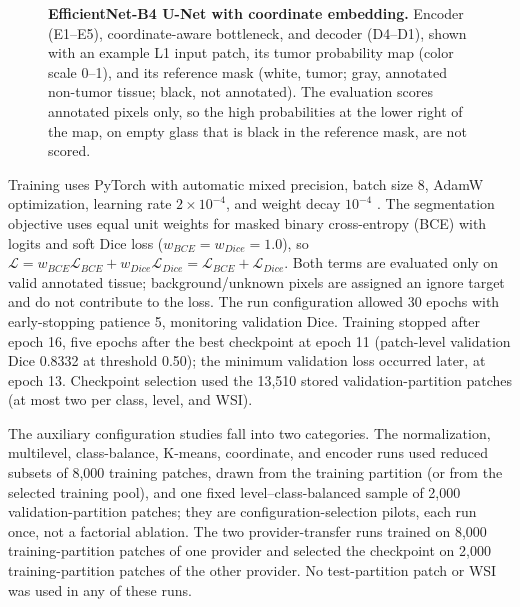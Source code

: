 \documentclass[10pt,letterpaper]{article}
\begin{document}
\begin{figure}[H]
\centering
\caption{\textbf{EfficientNet-B4 U-Net with coordinate embedding.} Encoder (E1--E5), coordinate-aware bottleneck, and decoder (D4--D1), shown with an example L1 input patch, its tumor probability map (color scale 0--1), and its reference mask (white, tumor; gray, annotated non-tumor tissue; black, not annotated). The evaluation scores annotated pixels only, so the high probabilities at the lower right of the map, on empty glass that is black in the reference mask, are not scored.}
\label{fig:arch}
\end{figure}

Training uses PyTorch with automatic mixed precision, batch size 8, AdamW optimization, learning rate $2\times10^{-4}$, and weight decay $10^{-4}$ \cite{bib36,bib37}. The segmentation objective uses equal unit weights for masked binary cross-entropy (BCE) with logits and soft Dice loss ($w_{BCE}=w_{Dice}=1.0$), so $\mathcal{L}=w_{BCE}\mathcal{L}_{BCE}+w_{Dice}\mathcal{L}_{Dice}=\mathcal{L}_{BCE}+\mathcal{L}_{Dice}$. Both terms are evaluated only on valid annotated tissue; background/unknown pixels are assigned an ignore target and do not contribute to the loss. The run configuration allowed 30 epochs with early-stopping patience 5, monitoring validation Dice. Training stopped after epoch 16, five epochs after the best checkpoint at epoch 11 (patch-level validation Dice 0.8332 at threshold 0.50); the minimum validation loss occurred later, at epoch 13. Checkpoint selection used the 13,510 stored validation-partition patches (at most two per class, level, and WSI).

The auxiliary configuration studies fall into two categories. The normalization, multilevel, class-balance, K-means, coordinate, and encoder runs used reduced subsets of 8,000 training patches, drawn from the training partition (or from the selected training pool), and one fixed level--class-balanced sample of 2,000 validation-partition patches; they are configuration-selection pilots, each run once, not a factorial ablation. The two provider-transfer runs trained on 8,000 training-partition patches of one provider and selected the checkpoint on 2,000 training-partition patches of the other provider. No test-partition patch or WSI was used in any of these runs.
\end{document}

